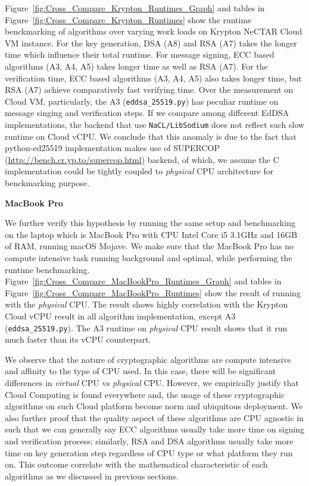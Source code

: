 \documentclass[10pt,sigconf]{acmart}
\begin{document}
Figure~\ref{fig:Cross_Compare_Krypton_Runtimes_Graph} and tables in Figure~\ref{fig:Cross_Compare_Krypton_Runtimes} show the runtime benckmarking of algorithms over varying work loads on Krypton NeCTAR Cloud VM instance. For the key generation, DSA (A8) and RSA (A7) takes the longer time which influence their total runtime. For message signing, ECC based algorithms (A3, A4, A5) takes longer time as well as RSA (A7). For the verification time, ECC based algorithms (A3, A4, A5) also takes longer time, but RSA (A7) achieve comparatively fast verifying time. Over the measurement on Cloud VM, particularly, the A3 (\verb|eddsa_25519.py|) has peculiar runtime on message singing and verification steps. If we compare among different EdDSA implementations, the backend that use \verb|NaCL/LibSodium| does not reflect such slow runtime on Cloud vCPU. We conclude that this anomaly is due to the fact that python-ed25519 \cite{BrianWarner} implementation makes use of SUPERCOP (\url {http://bench.cr.yp.to/supercop.html}) backend, of which, we assume the C implementation could be tightly coupled to \textit{physical} CPU architecture for benckmarking purpose.

\vspace{0.4em}

\noindent \textbf{MacBook Pro}

We further verify this hypothesis by running the same setup and benchmarking on the laptop which is MacBook Pro with CPU Intel Core i5 3.1GHz and 16GB of RAM, running macOS Mojave. We make sure that the MacBook Pro has no compute intensive task running background and optimal, while performing the runtime benchmarking. Figure~\ref{fig:Cross_Compare_MacBookPro_Runtimes_Graph} and tables in Figure~\ref{fig:Cross_Compare_MacBookPro_Runtimes} show the result of running with the \textit{physical} CPU. The result shows highly correlation with the Krypton Cloud vCPU result in all algorithm implementation, except A3 (\verb|eddsa_25519.py|). The A3 runtime on \textit{physical} CPU result shows that it run much faster than its vCPU counterpart.

We observe that the nature of cryptographic algorithms are compute intensive and affinity to the type of CPU used. In this case, there will be significant differences in \textit{virtual} CPU vs \textit{physical} CPU. However, we empirically justify that Cloud Computing is found everywhere \cite{Armbrust:2010:VCC:1721654.1721672} and, the usage of these cryptographic algorithms on such Cloud platform become norm and ubiquitous deployment. We also further proof that the quality aspect of these algorithms are CPU agnostic in such that we can generally say ECC algorithms usually take more time on signing and verification process; similarly, RSA and DSA algorithms usually take more time on key generation step regardless of CPU type or what platform they run on. This outcome correlate with the mathematical characteristic of each algorithms as we discussed in previous sections.
\end{document}
